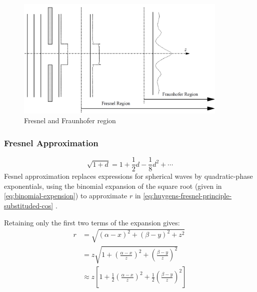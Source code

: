 \begin{figure}[H]
  \centering
  \includegraphics[width=0.9\textwidth]{fresnel_fraunhofer_approximations.png}
  \caption{Fresnel and Fraunhofer region \cite{Wilkinson2019}}\label{fig:fresnel_fraunhofer_approximations}
\end{figure}


\subsubsection{Fresnel Approximation}
\begin{equation}
  \sqrt{1+d} = 1 + \frac{1}{2}d - \frac{1}{8}d^2 + \cdots \label{eq:binomial-expension}
\end{equation}
Fesnel approximation replaces expressions for spherical waves by quadratic-phase exponentials, using the binomial expansion of the square root (given in \cref{eq:binomial-expension}) to approximate $r$ in \cref{eq:huygens-fresnel-principle-substituded-cos} \cite{Goodman2017}.

Retaining only the first two terms of the expansion gives:
\begin{align}
  r & = \sqrt{(\alpha-x)^2 + (\beta-y)^2 + z^2}                                                                                                              \\
    & = z \sqrt{1 + \left( \frac{\alpha-x}{z} \right)^2 + \left(\frac{\beta-y}{z}\right)^2}                                                                  \\
    & \approx z \left[ 1 + \frac{1}{2} \left( \frac{\alpha-x}{z} \right)^2 + \frac{1}{2} \left(\frac{\beta-y}{z}\right)^2 \right] \label{eq:r-approximation}
\end{align}

